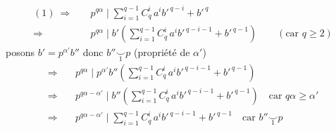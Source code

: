 \[
\begin{aligned}
(1)\ \Longrightarrow\quad&p^{q\alpha}\mid\sum_{i=1}^{q-1}C_q^i\,a^i b'^{\,q-i}+b'^{\,q}\\
\Longrightarrow\quad&p^{q\alpha}\mid b'\left(\sum_{i=1}^{q-1}C_q^i\,a^i b'^{\,q-i-1}+b'^{\,q-1}\right)\qquad(\text{car }q\geqslant2)
\end{aligned}
\]
posons $b'=p^{\alpha'}b''$ donc $b''\mathrel{\underset{1}{\smile}}p$ (propriété de $\alpha'$)
\[
\begin{aligned}
\Longrightarrow\quad&p^{q\alpha}\mid p^{\alpha'}b''\left(\sum_{i=1}^{q-1}C_q^i\,a^i b'^{\,q-i-1}+b'^{\,q-1}\right)\\
\Longrightarrow\quad&p^{q\alpha-\alpha'}\mid b''\left(\sum_{i=1}^{q-1}C_q^i\,a^i b'^{\,q-i-1}+b'^{\,q-1}\right)\quad\text{car }q\alpha\geqslant\alpha'\\
\Longrightarrow\quad&p^{q\alpha-\alpha'}\mid\sum_{i=1}^{q-1}C_q^i\,a^i b'^{\,q-i-1}+b'^{\,q-1}\quad\text{car }b''\mathrel{\underset{1}{\smile}}p
\end{aligned}
\]
